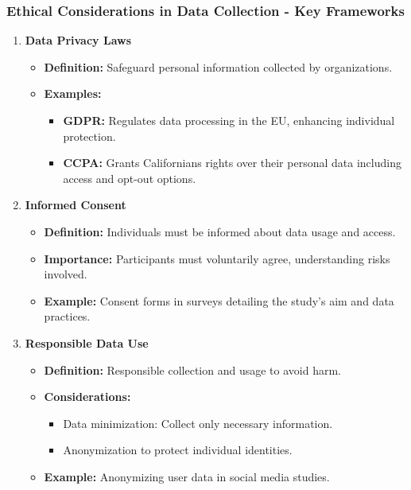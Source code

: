 \documentclass{beamer}
\begin{document}
\begin{frame}[fragile]
    \frametitle{Ethical Considerations in Data Collection - Key Frameworks}
    \begin{enumerate}
        \item \textbf{Data Privacy Laws}
            \begin{itemize}
                \item \textbf{Definition:} Safeguard personal information collected by organizations.
                \item \textbf{Examples:}
                    \begin{itemize}
                        \item \textbf{GDPR:} Regulates data processing in the EU, enhancing individual protection.
                        \item \textbf{CCPA:} Grants Californians rights over their personal data including access and opt-out options.
                    \end{itemize}
            \end{itemize}

        \item \textbf{Informed Consent}
            \begin{itemize}
                \item \textbf{Definition:} Individuals must be informed about data usage and access.
                \item \textbf{Importance:} Participants must voluntarily agree, understanding risks involved.
                \item \textbf{Example:} Consent forms in surveys detailing the study's aim and data practices.
            \end{itemize}

        \item \textbf{Responsible Data Use}
            \begin{itemize}
                \item \textbf{Definition:} Responsible collection and usage to avoid harm.
                \item \textbf{Considerations:} 
                    \begin{itemize}
                        \item Data minimization: Collect only necessary information.
                        \item Anonymization to protect individual identities.
                    \end{itemize}
                \item \textbf{Example:} Anonymizing user data in social media studies.
            \end{itemize}
    \end{enumerate}
\end{frame}
\end{document}
